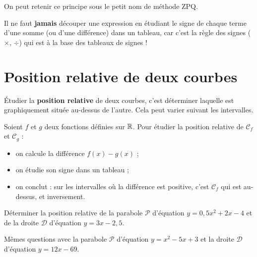 \documentclass[a4paper,11pt]{article}
\begin{document}
\begin{cidee}
On peut retenir ce principe sous le \og petit \fg{} nom de \textsf{méthode ZPQ}.
\end{cidee}

\begin{cattention}
Il ne faut \textbf{jamais} découper une expression en étudiant le signe de chaque terme d'une somme (ou d'une différence) dans un tableau, car c'est la règle des signes ($\times$, $\div$) qui est à la base des tableaux de signes !
\end{cattention}

\section{Position relative de deux courbes}

\begin{cdefi}
Étudier la \textbf{position relative} de deux courbes, c'est déterminer laquelle est graphiquement située au-dessus de l'autre. Cela peut varier suivant les intervalles.
\end{cdefi}

\begin{cmethode}
Soient $f$ et $g$ deux fonctions définies sur $\R$. Pour étudier la position relative de $\mathscr{C}_f$ et $\mathscr{C}_g$ :
\begin{itemize}
	\item on calcule la différence $f(x)-g(x)$ ;
	\item on étudie son signe dans un tableau ;
	\item on conclut : sur les intervalles où la différence est positive, c'est $\mathscr{C}_f$ qui est au-dessus, et inversement.
\end{itemize}
\end{cmethode}

\begin{cexemple}[s]
Déterminer la position relative de la parabole $\mathscr{P}$ d'équation $y=0,5x^2+2x-4$ et de la droite $\mathscr{D}$ d'équation $y=3x-2,5$.

Mêmes questions avec la parabole $\mathscr{P}$ d'équation $y=x^2-5x+3$ et la droite $\mathscr{D}$ d'équation $y=12x-69$.
\end{cexemple}
\end{document}
